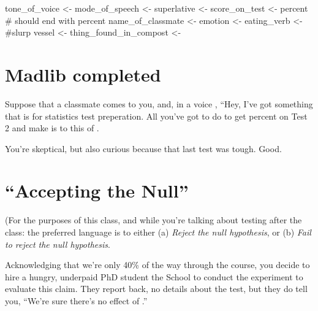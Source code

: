 \documentclass[
  letterpaper,
  DIV=11,
  numbers=noendperiod]{scrreprt}
\newenvironment{Shaded}{\begin{snugshade}}{\end{snugshade}}
\newcommand{\CommentTok}[1]{\textcolor[rgb]{0.37,0.37,0.37}{#1}}
\newcommand{\NormalTok}[1]{\textcolor[rgb]{0.00,0.23,0.31}{#1}}
\newcommand{\OtherTok}[1]{\textcolor[rgb]{0.00,0.23,0.31}{#1}}
\newcommand{\StringTok}[1]{\textcolor[rgb]{0.13,0.47,0.30}{#1}}
\begin{document}
\begin{Shaded}
\begin{Highlighting}[]
\NormalTok{tone\_of\_voice     }\OtherTok{\textless{}{-}} \StringTok{\textquotesingle{}\textquotesingle{}}
\NormalTok{mode\_of\_speech    }\OtherTok{\textless{}{-}} \StringTok{\textquotesingle{}\textquotesingle{}}
\NormalTok{superlative       }\OtherTok{\textless{}{-}} \StringTok{\textquotesingle{}\textquotesingle{}}
\NormalTok{score\_on\_test     }\OtherTok{\textless{}{-}} \StringTok{\textquotesingle{}percent\textquotesingle{}} \CommentTok{\# should end with percent}
\NormalTok{name\_of\_classmate }\OtherTok{\textless{}{-}} \StringTok{\textquotesingle{}\textquotesingle{}}
\NormalTok{emotion           }\OtherTok{\textless{}{-}} \StringTok{\textquotesingle{}\textquotesingle{}}
\NormalTok{eating\_verb       }\OtherTok{\textless{}{-}} \StringTok{\textquotesingle{}\textquotesingle{}} \CommentTok{\#slurp}
\NormalTok{vessel            }\OtherTok{\textless{}{-}} \StringTok{\textquotesingle{}\textquotesingle{}} 
\NormalTok{thing\_found\_in\_compost }\OtherTok{\textless{}{-}} \StringTok{\textquotesingle{}\textquotesingle{}}
\end{Highlighting}
\end{Shaded}

\section{Madlib completed}\label{madlib-completed}

Suppose that a classmate comes to you, and, in a voice , ``Hey, I've got
something that is for statistics test preperation. All you've got to do
to get percent on Test 2 and make is to this of .

You're skeptical, but also curious because that last test was tough.
Good.

\section{``Accepting the Null''}\label{accepting-the-null}

(For the purposes of this class, and while you're talking about testing
after the class: the preferred language is to either (a) \emph{Reject
the null hypothesis}, or (b) \emph{Fail to reject the null hypothesis}.

Acknowledging that we're only 40\% of the way through the course, you
decide to hire a hungry, underpaid PhD student the School to conduct the
experiment to evaluate this claim. They report back, no details about
the test, but they do tell you, ``We're sure there's no effect of .''
\end{document}
